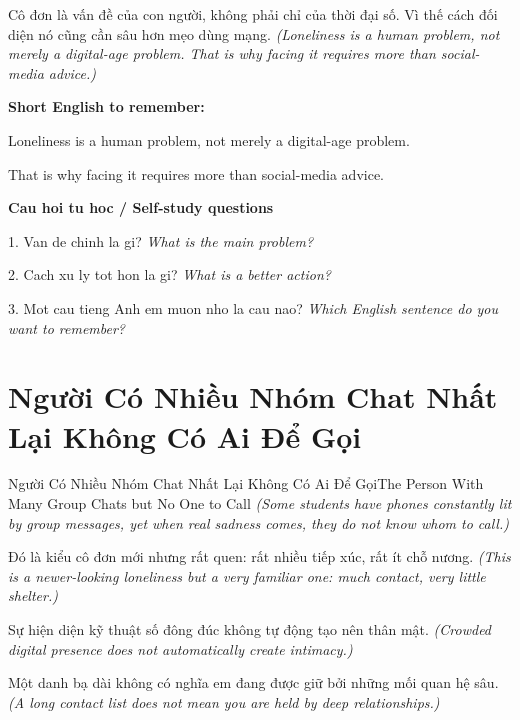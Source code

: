 \begin{baihoc}
Cô đơn là vấn đề của con người, không phải chỉ của thời đại số. Vì thế cách đối diện nó cũng cần sâu hơn mẹo dùng mạng.
\textit{(Loneliness is a human problem, not merely a digital-age problem. That is why facing it requires more than social-media advice.)}
\end{baihoc}

\begin{ghinhoanh}
\textbf{Short English to remember:}

Loneliness is a human problem, not merely a digital-age problem.

That is why facing it requires more than social-media advice.

\end{ghinhoanh}

\begin{tuhocnhanh}
\textbf{Cau hoi tu hoc / Self-study questions}

1. Van de chinh la gi? \textit{What is the main problem?}

2. Cach xu ly tot hon la gi? \textit{What is a better action?}

3. Mot cau tieng Anh em muon nho la cau nao? \textit{Which English sentence do you want to remember?}
\end{tuhocnhanh}
\ngancach

\section{Người Có Nhiều Nhóm Chat Nhất Lại Không Có Ai Để Gọi}
\begin{truyen}{Người Có Nhiều Nhóm Chat Nhất Lại Không Có Ai Để Gọi}{The Person With Many Group Chats but No One to Call}
\textit{(Some students have phones constantly lit by group messages, yet when real sadness comes, they do not know whom to call.)}

Đó là kiểu cô đơn mới nhưng rất quen: rất nhiều tiếp xúc, rất ít chỗ nương.
\textit{(This is a newer-looking loneliness but a very familiar one: much contact, very little shelter.)}

Sự hiện diện kỹ thuật số đông đúc không tự động tạo nên thân mật.
\textit{(Crowded digital presence does not automatically create intimacy.)}

Một danh bạ dài không có nghĩa em đang được giữ bởi những mối quan hệ sâu.
\textit{(A long contact list does not mean you are held by deep relationships.)}

\end{truyen}

